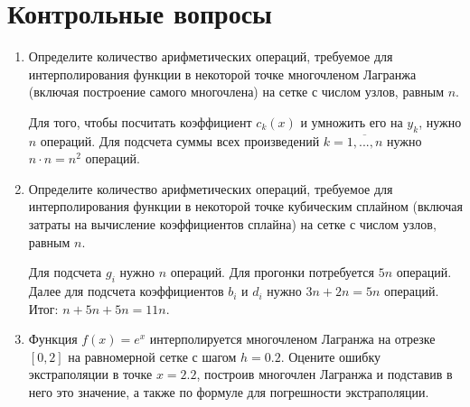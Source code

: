 \documentclass[12pt, a4paper]{article}
\begin{document}
\section{Контрольные вопросы}
\begin{enumerate}

\item Определите количество арифметических операций, требуемое для интерполирования функции в некоторой точке многочленом Лагранжа (включая построение самого многочлена) на сетке с числом узлов, равным $n$.

Для того, чтобы посчитать коэффициент $c_k(x)$ и умножить его на $y_k$, нужно $n$ операций. Для подсчета суммы всех произведений $k = \overline{1,..., n}$ нужно $n \cdot n = n^2$ операций.

\item Определите количество арифметических операций, требуемое для интерполирования функции в некоторой точке кубическим сплайном (включая затраты на вычисление коэффициентов сплайна) на сетке с числом узлов, равным $n$.

Для подсчета $g_i$ нужно $n$ операций. Для прогонки потребуется $5n$ операций. Далее для подсчета коэффициентов $b_i$ и $d_i$ нужно $3n + 2n = 5n$ операций. Итог: $n + 5n + 5n = 11n$.

\pagebreak

\item Функция $f(x) = e^x$ интерполируется многочленом Лагранжа на отрезке $[0, 2]$ на равномерной сетке с шагом $h = 0{.}2$. Оцените ошибку экстраполяции в точке $x = 2{.}2$, построив многочлен Лагранжа и подставив в него это значение, а также по формуле для погрешности экстраполяции.


\end{enumerate}
\end{document}
